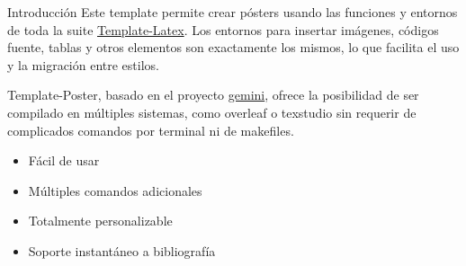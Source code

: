 %
%

\begin{block}{Introducción}
	Este template permite crear pósters usando las funciones y entornos de toda la suite \href{https://latex.ppizarror.com/}{Template-Latex}. Los entornos para insertar imágenes, códigos fuente, tablas y otros elementos son exactamente los mismos, lo que facilita el uso y la migración entre estilos.
	
\end{block}

\begin{exampleblock}{}
	Template-Poster, basado en el proyecto \href{https://github.com/anishathalye/gemini}{gemini}, ofrece la posibilidad de ser compilado en múltiples sistemas, como overleaf o texstudio sin requerir de complicados comandos por terminal ni de makefiles.
	
	\begin{itemize}
		\item Fácil de usar \cite{template}
		\item Múltiples comandos adicionales
		\item Totalmente personalizable
		\item Soporte instantáneo a bibliografía \cite{einstein}
	\end{itemize}
\end{exampleblock}

